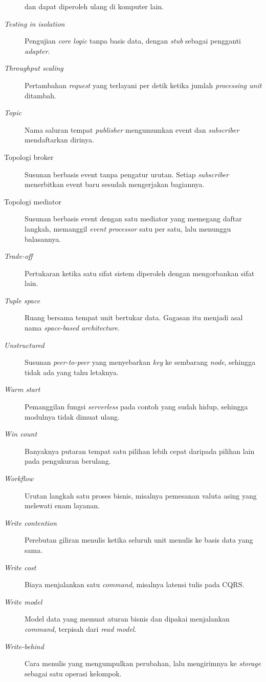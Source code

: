 \begin{description}
    dan dapat diperoleh ulang di komputer lain.
  \item[\textit{Testing in isolation}] Pengujian \textit{core logic} tanpa basis
    data, dengan \textit{stub} sebagai pengganti \textit{adapter}.
  \item[\textit{Throughput scaling}] Pertambahan \textit{request} yang
    terlayani per detik ketika jumlah \textit{processing unit} ditambah.
  \item[\textit{Topic}] Nama saluran tempat \textit{publisher} mengumumkan event
    dan \textit{subscriber} mendaftarkan dirinya.
  \item[Topologi broker] Susunan berbasis event tanpa pengatur urutan. Setiap
    \textit{subscriber} menerbitkan event baru sesudah mengerjakan bagiannya.
  \item[Topologi mediator] Susunan berbasis event dengan satu mediator yang
    memegang daftar langkah, memanggil \textit{event processor} satu per satu,
    lalu menunggu balasannya.
  \item[\textit{Trade-off}] Pertukaran ketika satu sifat sistem diperoleh dengan
    mengorbankan sifat lain.
  \item[\textit{Tuple space}] Ruang bersama tempat unit bertukar data. Gagasan
    itu menjadi asal nama \textit{space-based architecture}.
  \item[\textit{Unstructured}] Susunan \textit{peer-to-peer} yang menyebarkan
    \textit{key} ke sembarang \textit{node}, sehingga tidak ada yang tahu
    letaknya.
  \item[\textit{Warm start}] Pemanggilan fungsi \textit{serverless} pada contoh
    yang sudah hidup, sehingga modulnya tidak dimuat ulang.
  \item[\textit{Win count}] Banyaknya putaran tempat satu pilihan lebih cepat
    daripada pilihan lain pada pengukuran berulang.
  \item[\textit{Workflow}] Urutan langkah satu proses bisnis, misalnya
    pemesanan valuta asing yang melewati enam layanan.
  \item[\textit{Write contention}] Perebutan giliran menulis ketika seluruh unit
    menulis ke basis data yang sama.
  \item[\textit{Write cost}] Biaya menjalankan satu \textit{command},
    misalnya latensi tulis pada CQRS.
  \item[\textit{Write model}] Model data yang memuat aturan bisnis dan
    dipakai menjalankan \textit{command}, terpisah dari \textit{read model}.
  \item[\textit{Write-behind}] Cara menulis yang mengumpulkan perubahan, lalu
    mengirimnya ke \textit{storage} sebagai satu operasi kelompok.
\end{description}
